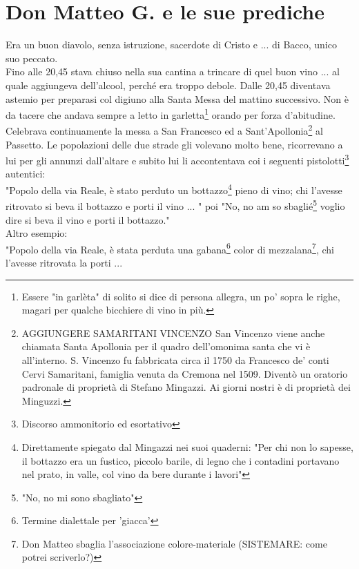 
\chapter{Don Matteo G. e le sue prediche}
Era un buon diavolo, senza istruzione, sacerdote di Cristo e ... di Bacco, unico suo peccato.\\
Fino alle 20,45 stava chiuso nella sua cantina a trincare di quel buon vino ... al quale aggiungeva dell'alcool, perché era troppo debole. Dalle 20,45 diventava astemio per preparasi col digiuno alla Santa Messa del mattino successivo. Non è da tacere che andava sempre a letto in garletta\footnote{Essere "in garlèta" di solito si dice di persona allegra, un po' sopra le righe, magari per qualche bicchiere di vino in più.} orando per forza d'abitudine. \\ Celebrava continuamente la messa a San Francesco ed a Sant'Apollonia\footnote{AGGIUNGERE SAMARITANI VINCENZO San Vincenzo viene anche chiamata Santa Apollonia per il quadro dell'omonima santa che vi è all'interno. S. Vincenzo fu fabbricata circa il 1750 da Francesco de' conti Cervi Samaritani, famiglia venuta da Cremona nel 1509. Diventò un oratorio padronale di proprietà di Stefano Mingazzi. Ai giorni nostri è di proprietà dei Minguzzi.} al Passetto. Le popolazioni delle due strade gli volevano molto bene, ricorrevano a lui per gli annunzi dall'altare e subito lui li accontentava coi i seguenti pistolotti\footnote{Discorso ammonitorio ed esortativo} autentici:\\
"Popolo della via Reale, è stato perduto un bottazzo\footnote{Direttamente spiegato dal Mingazzi nei suoi quaderni: "Per chi non lo sapesse, il bottazzo era un fustico, piccolo barile, di legno che i contadini portavano nel prato, in valle, col vino da bere durante i lavori"} pieno di vino; chi l'avesse ritrovato si beva il bottazzo e porti il vino ... " poi "No, no am so sbaglié\footnote{"No, no mi sono sbagliato"} voglio dire si beva il vino e porti il bottazzo."\\
Altro esempio:\\
"Popolo della via Reale, è stata perduta una gabana\footnote{Termine dialettale per 'giacca'} color di mezzalana\footnote{Don Matteo sbaglia l'associazione colore-materiale (SISTEMARE: come potrei scriverlo?)}, chi l'avesse ritrovata la porti ...\\
